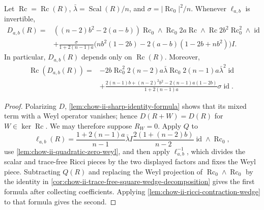 \begin{theorem}
  \label{thm:chow-ii-conjugation-defect-formula}
  Let \(\operatorname{Rc}=\operatorname{Rc}(R)\),
  \(\bar\lambda=\operatorname{Scal}(R)/n\), and
  \(\sigma=|\operatorname{Rc}_0|^2/n\).  Whenever \(\ell_{a,b}\) is
  invertible,
  \[
  \begin{aligned}
  D_{a,b}(R)={}&((n-2)b^2-2(a-b))\operatorname{Rc}_0\wedge\operatorname{Rc}_0
  2a\operatorname{Rc}\wedge\operatorname{Rc}
  2b^2\operatorname{Rc}_0^2\wedge\operatorname{id}\\
  &+\frac{\sigma}{1+2(n-1)a}
  \bigl(nb^2(1-2b)-2(a-b)(1-2b+nb^2)\bigr)I.
  \end{aligned}
  \]
  In particular, \(D_{a,b}(R)\) depends only on \(\operatorname{Rc}(R)\).
  Moreover,
  \[
  \begin{aligned}
  \operatorname{Rc}(D_{a,b}(R))={}&-2b\operatorname{Rc}_0^2
  2(n-2)a\bar\lambda\operatorname{Rc}_0
  2(n-1)a\bar\lambda^2\operatorname{id}\\
  &+\frac{2(n-1)b+(n-2)^2b^2-2(n-1)a(1-2b)}{1+2(n-1)a}
     \sigma\operatorname{id}.
  \end{aligned}
  \]
\end{theorem}
\begin{proof}
  Polarizing \(D\), \ref{lem:chow-ii-sharp-identity-formula} shows that its
  mixed term with a Weyl operator vanishes; hence \(D(R+W)=D(R)\) for
  \(W\in\ker\operatorname{Rc}\).  We may therefore suppose \(R_W=0\).
  Apply \(Q\) to
  \[
  \ell_{a,b}(R)=\frac{1+2(n-1)a}{n-1}\bar\lambda I
    \frac{2(1+(n-2)b)}{n-2}\operatorname{id}\wedge\operatorname{Rc}_0,
  \]
  use \ref{lem:chow-ii-quadratic-zero-weyl}, and then apply
  \(\ell_{a,b}^{-1}\), which divides the scalar and trace-free Ricci pieces by
  the two displayed factors and fixes the Weyl piece.  Subtracting \(Q(R)\)
  and replacing the Weyl projection of
  \(\operatorname{Rc}_0\wedge\operatorname{Rc}_0\) by the identity in
  \ref{cor:chow-ii-trace-free-square-wedge-decomposition} gives the first
  formula after collecting coefficients.  Applying
  \ref{lem:chow-ii-ricci-contraction-wedge} to that formula gives the second.
\end{proof}

